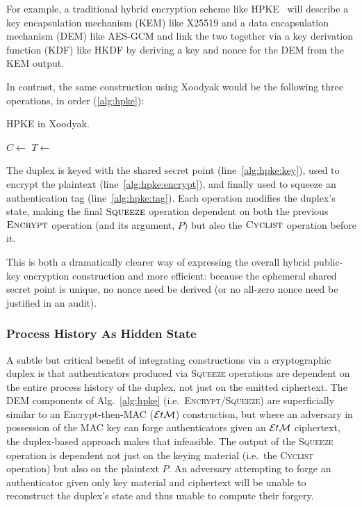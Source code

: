 For example, a traditional hybrid encryption scheme like HPKE~\cite{rfc9180} will describe a key encapsulation mechanism
(KEM) like X25519 and a data encapsulation mechanism (DEM) like AES-GCM and link the two together via a key derivation
function (KDF) like HKDF by deriving a key and nonce for the DEM from the KEM output.

In contrast, the same construction using Xoodyak would be the following three operations, in order (\ref{alg:hpke}):

\begin{algorithm}[ht]
    \caption{HPKE in Xoodyak.}
    \begin{algorithmic}[1]
        \State {}\label{alg:hpke:key}
        \State $C \gets $ \label{alg:hpke:encrypt}
        \State $T \gets $ \label{alg:hpke:tag}
    \end{algorithmic}
    \label{alg:hpke}
\end{algorithm}

The duplex is keyed with the shared secret point (line~\ref{alg:hpke:key}), used to encrypt the plaintext
(line~\ref{alg:hpke:encrypt}), and finally used to squeeze an authentication tag (line~\ref{alg:hpke:tag}).
Each operation modifies the duplex's state, making the final $\textsc{Squeeze}$ operation dependent on both the
previous $\textsc{Encrypt}$ operation (and its argument, $P$) but also the $\textsc{Cyclist}$ operation before it.

This is both a dramatically clearer way of expressing the overall hybrid public-key encryption construction and more
efficient: because the ephemeral shared secret point is unique, no nonce need be derived (or no all-zero nonce need be
justified in an audit).

\subsubsection{Process History As Hidden State}

A subtle but critical benefit of integrating constructions via a cryptographic duplex is that authenticators produced
via \textsc{Squeeze} operations are dependent on the entire process history of the duplex, not just on the emitted
ciphertext.
The DEM components of Alg.~\ref{alg:hpke} (i.e.\ \textsc{Encrypt}/\textsc{Squeeze}) are superficially similar to an
Encrypt-then-MAC ($\mathcal{E}t\mathcal{M}$) construction, but where an adversary in possession of the MAC key can forge authenticators
given an $\mathcal{E}t\mathcal{M}$ ciphertext, the duplex-based approach makes that infeasible.
The output of the \textsc{Squeeze} operation is dependent not just on the keying material (i.e.\ the \textsc{Cyclist}
operation) but also on the plaintext $P$.
An adversary attempting to forge an authenticator given only key material and ciphertext will be unable to reconstruct
the duplex's state and thus unable to compute their forgery.

